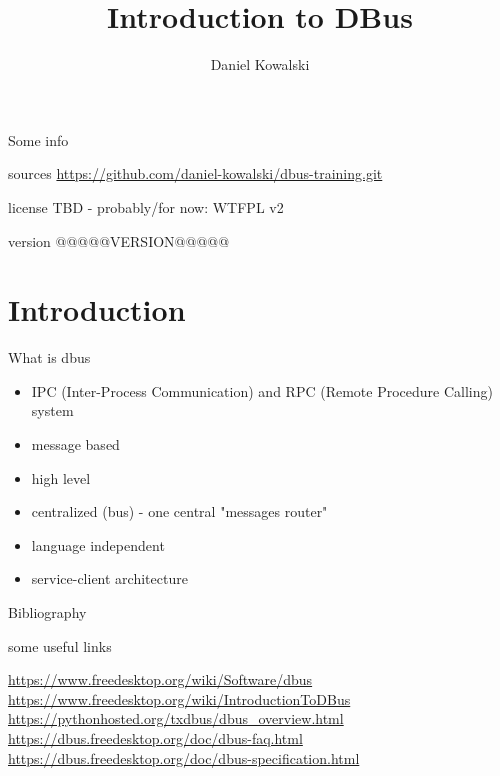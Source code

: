 \documentclass{beamer}
\title[Introduction to DBus]{Introduction to DBus}
\author{Daniel Kowalski}
\date{}
\begin{document}
\begin{frame}
\titlepage
\end{frame}


\begin{frame}{Some info}
  \begin{block}{sources}
    \url{https://github.com/daniel-kowalski/dbus-training.git}
  \end{block}
  \vfill
  \begin{block}{license}
    TBD - probably/for now: WTFPL v2
  \end{block}
  \vfill
  \begin{block}{version}
    @@@@@VERSION@@@@@
  \end{block}
\end{frame}

\begin{frame}
  \tableofcontents
\end{frame}

\section{Introduction}

\begin{frame}{What is dbus}
  \begin{itemize}
    \item IPC (Inter-Process Communication) and RPC (Remote Procedure Calling) system
    \item message based
    \item high level
    \item centralized (bus) - one central "messages router"
    \item language independent
    \item service-client architecture
  \end{itemize}
\end{frame}

\begin{frame}{Bibliography}
  \begin{exampleblock}{some useful links}
    \begin{small}
      \url{https://www.freedesktop.org/wiki/Software/dbus}\\
      \url{https://www.freedesktop.org/wiki/IntroductionToDBus}\\
      \url{https://pythonhosted.org/txdbus/dbus\_overview.html}\\
      \url{https://dbus.freedesktop.org/doc/dbus-faq.html}\\
      \url{https://dbus.freedesktop.org/doc/dbus-specification.html}\\
    \end{small}  
  \end{exampleblock}
\end{frame}
\end{document}

